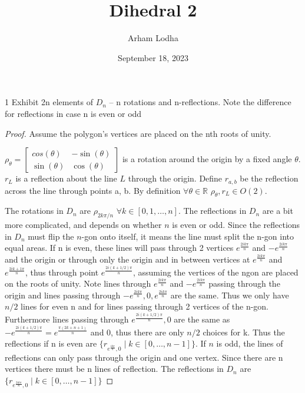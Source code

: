 \documentclass{article}
\newcommand{\R}{\mathbb{R}}
\begin{document}
\title{Dihedral 2}
\author{Arham Lodha}%
\date{September 18, 2023}%
\maketitle

\begin{PROB}{1}\label{Problem 1.}
    Exhibit 2n elements of $D_n$ -- n rotations and n-reflections.  Note the difference for reflections in case n is even or odd
\end{PROB}
\begin{proof}
    Assume the polygon's vertices are placed on the nth roots of unity.

    $\rho_\theta = \begin{bmatrix}
        cos(\theta) & -\sin(\theta) \\ \sin(\theta) & \cos(\theta)
    \end{bmatrix}$ is a rotation around the origin by a fixed angle $\theta$. $r_L$ is a reflection about the line $L$ through the origin. Define $r_{a,b}$ be the reflection across the line through points a, b. By definition $\forall \theta \in \R$ $\rho_\theta, r_L \in O(2)$.

    The rotations in $D_n$ are $\rho_{2k\pi/n}$ $\forall k \in [0, 1, \ldots, n]$. The reflections in $D_n$ are a bit more complicated, and depends on whether $n$ is even or odd. Since the reflections in $D_n$ must flip the $n$-gon onto itself, it means the line must split the n-gon into equal areas. If n is even, these lines will pass through 2 vertices $e^{\frac{2ik\pi}{n}}$ and $-e^{\frac{2ik\pi}{n}}$ and the origin or through only the origin and in between vertices at $e^{\frac{2ik\pi}{n}}$ and $e^{\frac{2ik+1\pi}{n}}$, thus through point $e^{\frac{2i(k + 1/2)\pi}{n}}$, assuming the vertices of the ngon are placed on the roots of unity. Note lines through $e^{\frac{2ik\pi}{n}}$ and $-e^{\frac{2ik\pi}{n}}$ passing through the origin and lines passing through $-e^{\frac{2ik\pi}{n}}, 0, e^{\frac{2ik\pi}{n}}$ are the same. Thus we only have $n/2$ lines for even n and for lines passing through 2 vertices of the n-gon. Furthermore lines passing through $e^{\frac{2i(k + 1/2)\pi}{n}}, 0$ are the same as $-e^{\frac{2i(k + 1/2)\pi}{n}} = e^{\frac{\pi(2k + n + 1)}{n}}$ and 0, thus there are only $n/2$ choices for k. Thus the reflections if n is even are $\{r_{e^{\frac{ik\pi}{n}}, 0} \mid k \in [0, \ldots, n - 1]\}$. If $n$ is odd, the lines of reflections can only pass through the origin and one vertex. Since there are n vertices there must be n lines of reflection. The reflections in $D_n$ are $\{r_{e^{\frac{2ik\pi}{n}}, 0} \mid k \in [0, \ldots, n - 1]\}$
\end{proof}
\end{document}

